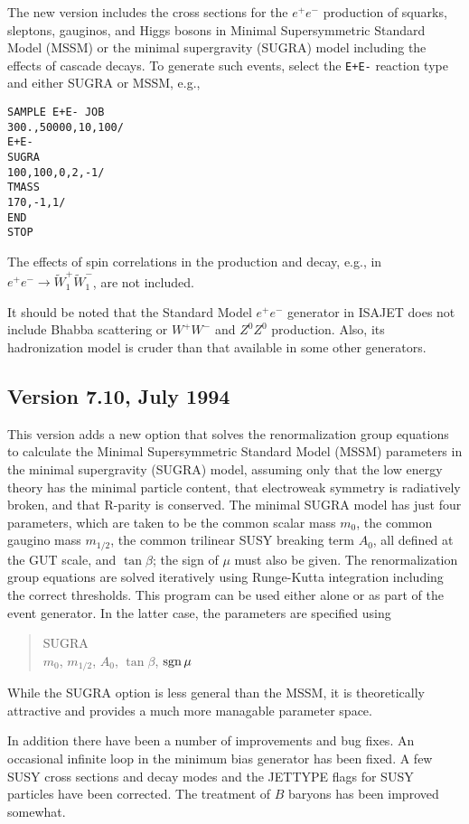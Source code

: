       The new version includes the cross sections for the $e^+e^-$
production of squarks, sleptons, gauginos, and Higgs bosons in Minimal
Supersymmetric Standard Model (MSSM) or the minimal supergravity
(SUGRA) model including the effects of cascade decays. To generate
such events, select the \verb|E+E-| reaction type and either SUGRA or
MSSM, e.g.,
\begin{verbatim}
SAMPLE E+E- JOB
300.,50000,10,100/
E+E-
SUGRA
100,100,0,2,-1/
TMASS
170,-1,1/
END
STOP
\end{verbatim}
The effects of spin correlations in the production and decay, e.g., in
$e^+e^- \to \widetilde W_1^+ \widetilde W_1^-$, are not included. 

      It should be noted that the Standard Model $e^+e^-$ generator in
ISAJET does not include Bhabba scattering or $W^+W^-$ and $Z^0Z^0$
production. Also, its hadronization model is cruder than that
available in some other generators.

\subsection{Version 7.10, July 1994}

       This version adds a new option that solves the renormalization group
equations to calculate the Minimal Supersymmetric Standard Model (MSSM)
parameters in the minimal supergravity (SUGRA) model, assuming only that the
low energy theory has the minimal particle content, that electroweak
symmetry is radiatively broken, and that R-parity is conserved.  The minimal
SUGRA model has just four parameters, which are taken to be the common
scalar mass $m_0$, the common gaugino mass $m_{1/2}$, the common trilinear
SUSY breaking term $A_0$, all defined at the GUT scale, and $\tan\beta$; the
sign of $\mu$ must also be given.  The renormalization group equations are
solved iteratively using Runge-Kutta integration including the correct
thresholds.  This program can be used either alone or as part of the event
generator.  In the latter case, the parameters are specified using
\begin{verse}
SUGRA\\
$m_0$, $m_{1/2}$, $A_0$, $\tan\beta$, $\mathop{\rm sgn}\mu$
\end{verse}
While the SUGRA option is less general than the MSSM, it is theoretically
attractive and provides a much more managable parameter space.

      In addition there have been a number of improvements and bug fixes.  An
occasional infinite loop in the minimum bias generator has been fixed.  A few
SUSY cross sections and decay modes and the JETTYPE flags for SUSY
particles have been corrected.  The treatment of $B$ baryons has been
improved somewhat.

